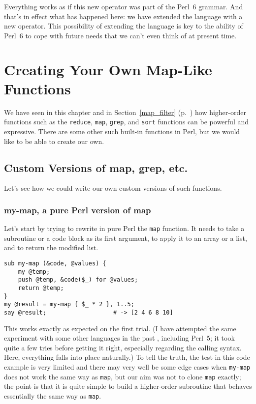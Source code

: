 Everything works as if this new operator was part 
of the Perl~6 grammar. And that's in effect what 
has happened here: we have extended the 
language with a new operator. This possibility of 
extending the language is key to the ability of  
Perl~6 to cope with future needs that we can't even 
think of at present time.

\section{Creating Your Own Map-Like Functions}
 
We have seen in this chapter and in 
Section~\ref{map_filter} (p.~\pageref{map_filter}) 
how higher-order functions such as the {\tt reduce}, 
{\tt map}, {\tt grep}, and {\tt sort} functions 
can be powerful and expressive. There are some 
other such built-in functions in Perl, but we would 
like to be able to create our own.

\subsection{Custom Versions of map, grep, etc.}

Let's see how we could write our own custom versions 
of such functions.

\subsubsection{my-map, a pure Perl version of map}

Let's start by trying to rewrite in pure Perl the 
{\tt map} function. It needs to take a subroutine 
or a code block as its first argument, to apply it 
to an array or a list, and to return the modified 
list.

\begin{verbatim}
sub my-map (&code, @values) { 
    my @temp;
    push @temp, &code($_) for @values;
    return @temp;
}
my @result = my-map { $_ * 2 }, 1..5; 
say @result;                   # -> [2 4 6 8 10]
\end{verbatim}

This works exactly as expected on the first trial. 
(I have attempted the same experiment with some other 
languages in the past , including Perl~5; it took quite 
a few tries before getting it right, especially 
regarding the calling syntax. Here, everything 
falls into place naturally.) To tell the truth, 
the test in this code example is very limited and 
there may very well be some edge cases when 
{\tt my-map} does not work the same way as {\tt map}, 
but our aim was not to clone {\tt map} exactly; 
the point is that it is quite simple to build a 
higher-order subroutine that behaves essentially the 
same way as {\tt map}. 

